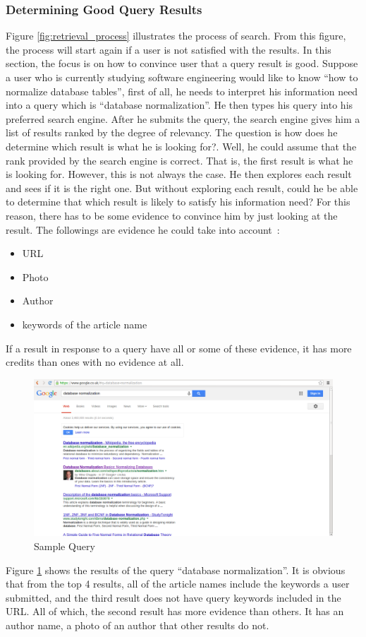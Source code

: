 \subsubsection{Determining Good Query Results}
Figure \ref{fig:retrieval_process} illustrates the process of search. From this figure, the process will start again if a user is not satisfied with 
the results. In this section, the focus is on how to convince user that a query result is good. Suppose a user who is currently studying software engineering
would like to know ``how to normalize database tables'', first of all, he needs to interpret his information need into a query which is ``database normalization''.
He then types his query into his preferred search engine. After he submits the query, the search engine gives him a list of results ranked by the degree
of relevancy. The question is how does he determine which result is what he is looking for?. Well, he could assume that the rank provided by the search 
engine is correct. That is, the first result is what he is looking for. However, this is not always the case. He then explores each result and sees if 
it is the right one. But without exploring each result, could he be able to determine that which result is likely to satisfy his information need?
For this reason, there has to be some evidence to convince him by just looking at the result. The followings are evidence he could take into account~\cite{craig}: 
\begin{itemize}
 \item URL
 \item Photo
 \item Author
 \item keywords of the article name
\end{itemize}
If a result in response to a query have all or some of these evidence, it has more credits than ones with no evidence at all. 
\begin{figure}
\centering
\includegraphics[scale=0.3]{./figures/query.png}
\caption{Sample Query} \label{fig:query}
\end{figure}
Figure \ref{fig:query} shows the results of the query ``database normalization''. It is obvious that from the top 4 results, all of the article names
include the keywords a user submitted, and the third result does not have query keywords included in the URL. All of which, the second result has more 
evidence than others. It has an author name, a photo of an author that other results do not.

